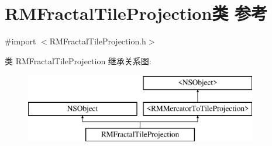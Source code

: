 \hypertarget{interface_r_m_fractal_tile_projection}{\section{R\-M\-Fractal\-Tile\-Projection类 参考}
\label{interface_r_m_fractal_tile_projection}
}


{\ttfamily \#import $<$R\-M\-Fractal\-Tile\-Projection.\-h$>$}

类 R\-M\-Fractal\-Tile\-Projection 继承关系图\-:\begin{figure}[H]
\begin{center}
\leavevmode
\includegraphics[height=3.000000cm]{interface_r_m_fractal_tile_projection}
\end{center}
\end{figure}
